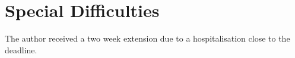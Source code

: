 \section*{Special Difficulties}

The author received a two week extension due to a hospitalisation close to the deadline.

\cleardoublepage

\tableofcontents

\newpage




\cleardoublepage
\setcounter{page}{1}
\pagestyle{headings}